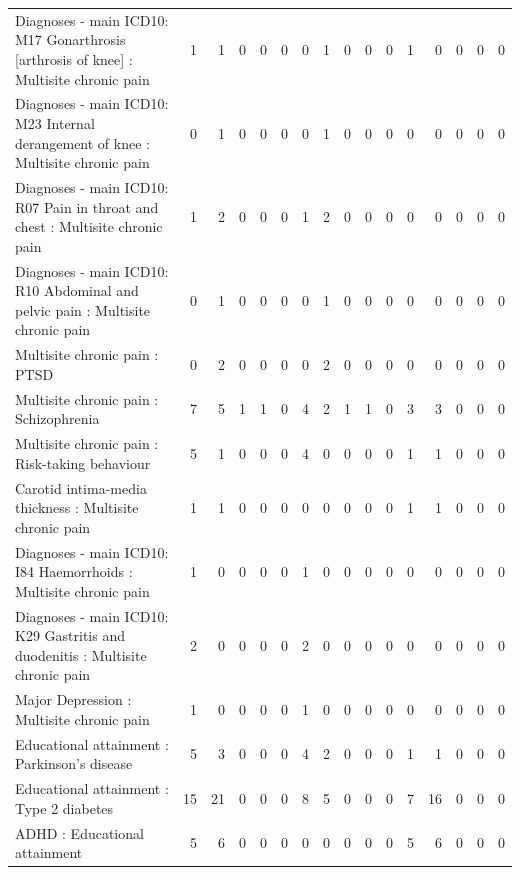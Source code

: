 \begin{table}[ht]
\begin{tabular}{lrrrrrrrrrrrrrrr}
  Diagnoses - main ICD10: M17 Gonarthrosis [arthrosis of knee] : Multisite chronic pain &   1 &   1 &   0 &   0 &   0 &   0 &   1 &   0 &   0 &   0 &   1 &   0 &   0 &   0 &   0 \\ 
  Diagnoses - main ICD10: M23 Internal derangement of knee : Multisite chronic pain &   0 &   1 &   0 &   0 &   0 &   0 &   1 &   0 &   0 &   0 &   0 &   0 &   0 &   0 &   0 \\ 
  Diagnoses - main ICD10: R07 Pain in throat and chest : Multisite chronic pain &   1 &   2 &   0 &   0 &   0 &   1 &   2 &   0 &   0 &   0 &   0 &   0 &   0 &   0 &   0 \\ 
  Diagnoses - main ICD10: R10 Abdominal and pelvic pain : Multisite chronic pain &   0 &   1 &   0 &   0 &   0 &   0 &   1 &   0 &   0 &   0 &   0 &   0 &   0 &   0 &   0 \\ 
  Multisite chronic pain : PTSD &   0 &   2 &   0 &   0 &   0 &   0 &   2 &   0 &   0 &   0 &   0 &   0 &   0 &   0 &   0 \\ 
  Multisite chronic pain : Schizophrenia &   7 &   5 &   1 &   1 &   0 &   4 &   2 &   1 &   1 &   0 &   3 &   3 &   0 &   0 &   0 \\ 
  Multisite chronic pain : Risk-taking behaviour &   5 &   1 &   0 &   0 &   0 &   4 &   0 &   0 &   0 &   0 &   1 &   1 &   0 &   0 &   0 \\ 
  Carotid intima-media thickness : Multisite chronic pain &   1 &   1 &   0 &   0 &   0 &   0 &   0 &   0 &   0 &   0 &   1 &   1 &   0 &   0 &   0 \\ 
  Diagnoses - main ICD10: I84 Haemorrhoids : Multisite chronic pain &   1 &   0 &   0 &   0 &   0 &   1 &   0 &   0 &   0 &   0 &   0 &   0 &   0 &   0 &   0 \\ 
  Diagnoses - main ICD10: K29 Gastritis and duodenitis : Multisite chronic pain &   2 &   0 &   0 &   0 &   0 &   2 &   0 &   0 &   0 &   0 &   0 &   0 &   0 &   0 &   0 \\ 
  Major Depression : Multisite chronic pain &   1 &   0 &   0 &   0 &   0 &   1 &   0 &   0 &   0 &   0 &   0 &   0 &   0 &   0 &   0 \\ 
  Educational attainment : Parkinson's disease &   5 &   3 &   0 &   0 &   0 &   4 &   2 &   0 &   0 &   0 &   1 &   1 &   0 &   0 &   0 \\ 
  Educational attainment : Type 2 diabetes &  15 &  21 &   0 &   0 &   0 &   8 &   5 &   0 &   0 &   0 &   7 &  16 &   0 &   0 &   0 \\ 
  ADHD : Educational attainment &   5 &   6 &   0 &   0 &   0 &   0 &   0 &   0 &   0 &   0 &   5 &   6 &   0 &   0 &   0 \\ 

\end{tabular}
\end{table}
